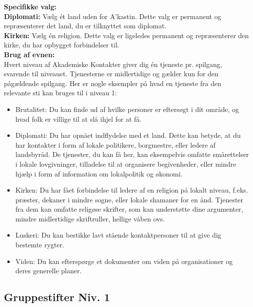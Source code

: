 \textbf{Specifikke valg:}\\
\textbf{Diplomati:} Vælg ét land uden for A’kastin. Dette valg er permanent og repræsenterer det land, du er tilknyttet som diplomat.\\
\textbf{Kirken:} Vælg én religion. Dette valg er ligeledes permanent og repræsenterer den kirke, du har opbygget forbindelser til.\\

\textbf{Brug af evnen:}\\
Hvert niveau af Akademiske Kontakter giver dig én tjeneste pr. spilgang, svarende til niveauet. Tjenesterne er midlertidige og gælder kun for den pågældende spilgang. Her er nogle eksempler på hvad en tjeneste fra den relevante sti kan bruges til i niveau 1:\\
\begin{itemize}
    \item Brutalitet: Du kan finde ud af hvilke personer er eftersøgt i dit område, og hvad folk er villige til at slå ihjel for at få.
    \item Diplomati: Du har opnået indflydelse med et land. Dette kan betyde, at du har kontakter i form af lokale politikere, borgmestre, eller ledere af landsbyråd. De tjenester, du kan få her, kan eksempelvis omfatte smårettelser i lokale lovgivninger, tilladelse til at organisere begivenheder, eller mindre hjælp i form af information om lokalpolitik og økonomi.
    \item Kirken: Du har fået forbindelse til ledere af en religion på lokalt niveau, f.eks. præster, dekaner i mindre sogne, eller lokale shamaner for en ånd. Tjenester fra dem kan omfatte religøse skrifter, som kan understøtte dine argumenter, mindre midlertidige skriftruller, hellige våben ovs.
    \item Luskeri: Du kan bestikke lavt stående kontaktpersoner til at give dig bestemte rygter.
    \item Viden: Du kan efterspørge et dokumenter om viden på organisationer og deres generelle planer.
\end{itemize}

\subsection*{Gruppestifter Niv. 1}

